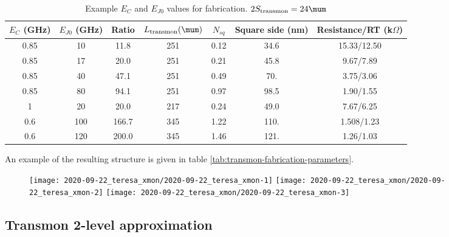  \begin{table}[h]
   \centering
   \caption{Example   $E_C$  and   $E_{J0}$   values  for   fabrication.
     $2S_{\text{transmon}}=24\mum$ \label{tab:transmon-fabrication-parameters}}
   \begin{tabular}{|c|c|c|c|c|c|c|}
     \hline
     $E_{C}$ (GHz) & $E_{J0}$ (GHz) & Ratio &  $L_{\text{transmon}} (\mum)$ & $N_{sq}$ & Square side (nm) & Resistance/RT (k$\Omega$)\\\hline
     0.85 &               10 &    11.8 &              251 &                  0.12 &              34.6 &                    15.33/12.50  \\
     0.85 &               17 &    20.0 &              251 &                  0.21 &              45.8 &                    9.67/7.89  \\
     0.85 &               40 &    47.1 &              251 &                  0.49 &               70. &                    3.75/3.06     \\
     0.85 &               80 &    94.1 &              251 &                  0.97 &              98.5 &                    1.90/1.55  \\
     1 &               20 &    20.0 &              217 &                  0.24 &              49.0 &                    7.67/6.25  \\
     0.6 &              100 &   166.7 &              345 &                  1.22 &              110. &                    1.508/1.23 \\
     0.6 &              120 &   200.0 &              345 &                  1.46 &              121. &                    1.26/1.03 \\\hline
   \end{tabular}
 \end{table}

 \noindent  An example  of the  resulting  structure is  given in  table
 \autoref{tab:transmon-fabrication-parameters}.

 \begin{figure}[h]
   \centering
   \texttt{[image: 2020-09-22\_teresa\_xmon/2020-09-22\_teresa\_xmon-1]}
   \texttt{[image: 2020-09-22\_teresa\_xmon/2020-09-22\_teresa\_xmon-2]}
   \texttt{[image: 2020-09-22\_teresa\_xmon/2020-09-22\_teresa\_xmon-3]}
 \end{figure}

 \noindent


 \newpage
 \subsection{Transmon 2-level approximation}
 \label{sec:transmon-2-level}


